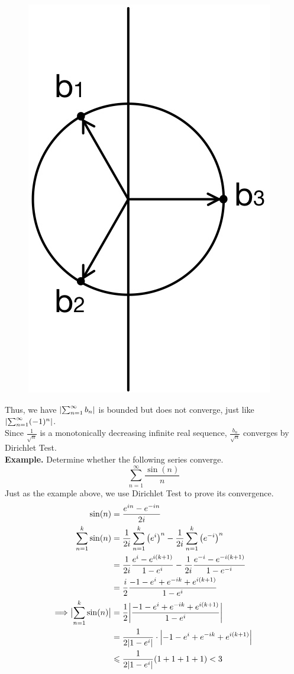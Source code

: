 \documentclass[11pt]{article}
\DeclarePairedDelimiter\abs{\lvert}{\rvert}
\begin{document}
\vspace{-2mm}
\begin{figure}[H]
\includegraphics[scale = 0.3]{15_1}
\centering
\end{figure} 
Thus, we have $\abs*{\sum_{n = 1}^{\infty} b_n}$ is bounded but does not converge, just like $\abs*{\sum_{n = 1}^{\infty} (-1)^n}$. \\
Since $\frac{1}{\sqrt{n}}$ is a monotonically decreasing infinite real sequence, $\frac{b_n}{\sqrt{n}}$ converges by Dirichlet Test. \\
\newline
\textbf{Example.} Determine whether the following series converge. 
$$\sum_{n = 1}^{\infty} \frac{\sin(n)}{n}$$ 
Just as the example above, we use Dirichlet Test to prove its convergence. 
\begin{align*}
\sin(n) &= \frac{e^{in} - e^{-in}}{2i} \\
\sum_{n = 1}^k \sin(n) &= \frac{1}{2i}\sum_{n = 1}^k\left(e^i\right)^n - \frac{1}{2i}\sum_{n = 1}^k\left(e^{-i}\right)^n \\
& = \frac{1}{2i}\frac{e^i - e^{i(k + 1)}}{1 - e^i} - \frac{1}{2i}\frac{e^{-i} - e^{-i(k + 1)}}{1 - e^{-i}} \\ 
& = \frac{i}{2} \frac{-1 - e^i + e^{-ik} + e^{i(k + 1)}}{1 - e^i} \\
\Longrightarrow \abs[\big]{\sum_{n = 1}^k \sin(n)} &= \frac{1}{2} \abs*{\frac{-1 - e^i + e^{-ik} + e^{i(k + 1)}}{1 - e^i}}\\ 
&= \frac{1}{2|1- e^i|}\cdot \abs[\Big]{-1 - e^i + e^{-ik} + e^{i(k + 1)}} \\
&\leqslant \frac{1}{2|1- e^i|}(1 + 1 + 1 + 1) < 3
\end{align*}
\end{document}
